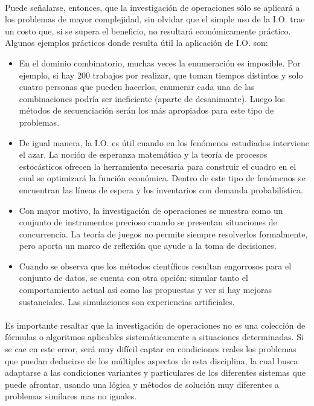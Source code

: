 \documentclass[12pt, a4paper,spanish]{article}
\begin{document}
		\paragraph{}
		Puede señalarse, entonces, que la investigación de operaciones sólo se aplicará a los problemas de mayor complejidad, sin olvidar que el simple uso de la I.O. trae un costo que, si se supera el beneficio, no resultará económicamente práctico. Algunos ejemplos prácticos donde resulta útil la aplicación de I.O. son:

		\begin{itemize}

			\item En el dominio combinatorio, muchas veces la enumeración es imposible. Por ejemplo, si hay 200 trabajos por realizar, que toman tiempos distintos y solo cuatro personas que pueden hacerlos, enumerar cada una de las combinaciones podría ser ineficiente (aparte de desanimante). Luego los métodos de secuenciación serán los más apropiados para este tipo de problemas.

			\item De igual manera, la I.O. es útil cuando en los fenómenos estudiados interviene el azar. La noción de esperanza matemática y la teoría de procesos estocásticos ofrecen la herramienta necesaria para construir el cuadro en el cual se optimizará la función económica. Dentro de este tipo de fenómenos se encuentran las líneas de espera y los inventarios con demanda probabilística.

			\item Con mayor motivo, la investigación de operaciones se muestra como un conjunto de instrumentos precioso cuando se presentan situaciones de concurrencia. La teoría de juegos no permite siempre resolverlos formalmente, pero aporta un marco de reflexión que ayude a la toma de decisiones.

			\item Cuando se observa que los métodos científicos resultan engorrosos para el conjunto de datos, se cuenta con otra opción: simular tanto el comportamiento actual así como las propuestas y ver si hay mejoras sustanciales. Las simulaciones son experiencias artificiales.

		\end{itemize}

		\paragraph{}
		Es importante resaltar que la investigación de operaciones no es una colección de fórmulas o algoritmos aplicables sistemáticamente a situaciones determinadas. Si se cae en este error, será muy difícil captar en condiciones reales los problemas que puedan deducirse de los múltiples aspectos de esta disciplina, la cual busca adaptarse a las condiciones variantes y particulares de los diferentes sistemas que puede afrontar, usando una lógica y métodos de solución muy diferentes a problemas similares mas no iguales.
\end{document}
